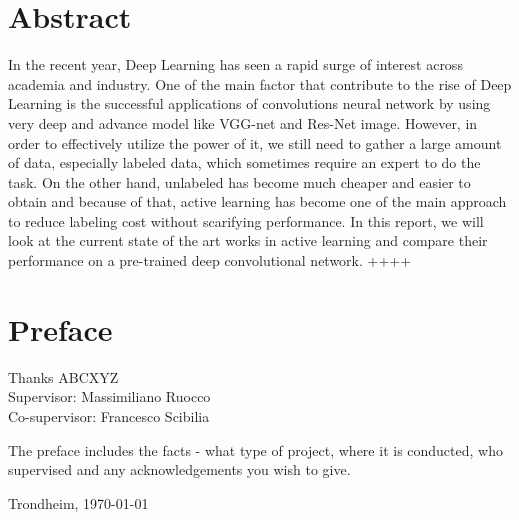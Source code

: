 \section*{Abstract}
In the recent year, Deep Learning has seen a rapid surge of interest across academia and industry. One of the main factor that contribute to the rise of Deep Learning is the successful applications of convolutions neural network by using very deep and advance model like VGG-net and  Res-Net image.
However, in order to effectively utilize the power of it, we still need to gather a large amount of data, especially labeled data, which sometimes require an expert to do the task. On the other hand, unlabeled has become much cheaper and easier to obtain and because of that, active learning has become one of the main approach to reduce labeling cost without scarifying performance. In this report, we will look at the current state of the art works in active learning and compare their performance on a pre-trained deep convolutional network. ++++

\clearpage

\section*{Preface}



\vspace{1cm}
Thanks ABCXYZ\\
Supervisor:  Massimiliano Ruocco\\
Co-supervisor:  Francesco Scibilia

The preface includes the facts - what type of project, where it is conducted, who supervised and any acknowledgements you wish to give. 

\vfill

\hfill \thesisAuthor

\hfill Trondheim, \today

\clearpage
